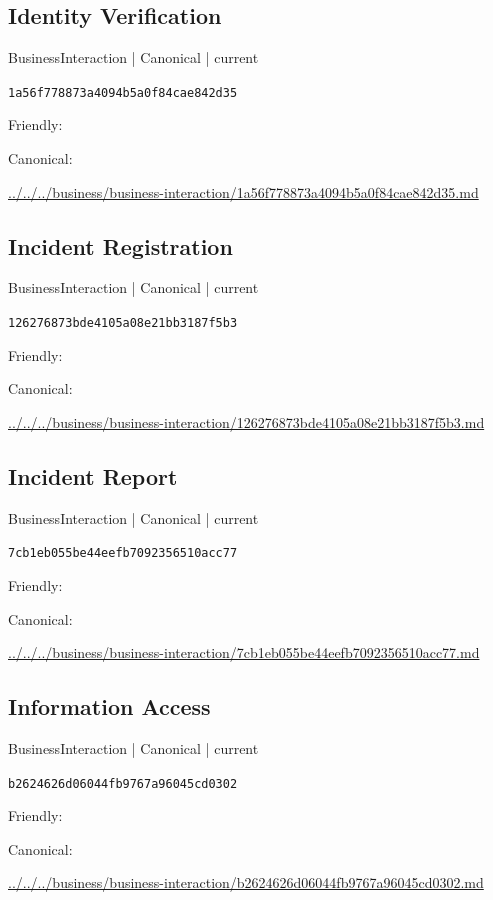 \documentclass[10pt,a4paper]{article}
\begin{document}
\subsection*{Identity Verification}
{\small BusinessInteraction | Canonical | current}\par
\texttt{1a56f778873a4094b5a0f84cae842d35}\par
Friendly: \par
Canonical: \par
{\footnotesize\url{../../../business/business-interaction/1a56f778873a4094b5a0f84cae842d35.md}}\par
\subsection*{Incident Registration}
{\small BusinessInteraction | Canonical | current}\par
\texttt{126276873bde4105a08e21bb3187f5b3}\par
Friendly: \par
Canonical: \par
{\footnotesize\url{../../../business/business-interaction/126276873bde4105a08e21bb3187f5b3.md}}\par
\subsection*{Incident Report}
{\small BusinessInteraction | Canonical | current}\par
\texttt{7cb1eb055be44eefb7092356510acc77}\par
Friendly: \par
Canonical: \par
{\footnotesize\url{../../../business/business-interaction/7cb1eb055be44eefb7092356510acc77.md}}\par
\subsection*{Information Access}
{\small BusinessInteraction | Canonical | current}\par
\texttt{b2624626d06044fb9767a96045cd0302}\par
Friendly: \par
Canonical: \par
{\footnotesize\url{../../../business/business-interaction/b2624626d06044fb9767a96045cd0302.md}}\par
\end{document}
